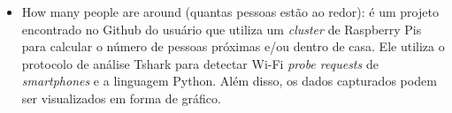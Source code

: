 \begin{itemize}
\item {How many people are around} (quantas pessoas estão ao redor): é um projeto encontrado no Github do usuário  que utiliza um \emph{cluster} de Raspberry Pis para calcular o número de pessoas próximas e/ou dentro de casa. Ele utiliza o protocolo de análise Tshark para detectar Wi-Fi \emph{probe requests} de \emph{smartphones} e a linguagem Python. Além disso, os dados capturados podem ser visualizados em forma de gráfico.

\end{itemize}
